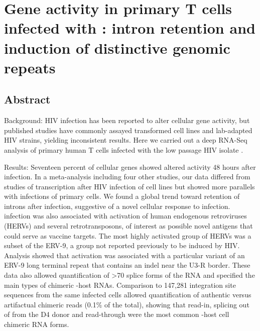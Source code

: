 \documentclass[../sherrill-Mix_thesis.tex]{subfiles}
\begin{document}
\graphicspath{{im/}{rnaSeq/im/}}


\newcommand{\nReads}{1,161,705,678}
\newcommand{\nHuman}{1,021,207,853}
\newcommand{\nHIV}{24,783,844}
\newcommand{\nHIVFrag}{12,689,879}
\newcommand{\nIntegrations}{147,281}


\chapter{Gene activity in primary T cells infected with \hivEight{}: intron retention and induction of distinctive genomic repeats}
\label{chapRnaSeq}


\section{Abstract}
	Background: HIV infection has been reported to alter cellular gene activity, but published studies have commonly assayed transformed cell lines and lab-adapted HIV strains, yielding inconsistent results. Here we carried out a deep RNA-Seq analysis of primary human T cells infected with the low passage HIV isolate \hivEight{}. 

	Results: Seventeen percent of cellular genes showed altered activity 48 hours after infection. In a meta-analysis including four other studies, our data differed from studies of transcription after HIV infection of cell lines but showed more parallels with infections of primary cells. We found a global trend toward retention of introns after infection, suggestive of a novel cellular response to infection. \hivEight{} infection was also associated with activation of human endogenous retroviruses (HERVs) and several retrotransposons, of interest as possible novel antigens that could serve as vaccine targets. The most highly activated group of HERVs was a subset of the ERV-9, a group not reported previously to be induced by HIV. Analysis showed that activation was associated with a particular variant of an ERV-9 long terminal repeat that contains an indel near the U3-R border. These data also allowed quantification of \textgreater{}70 splice forms of the \hivEight{} RNA and specified the main types of chimeric \hivEight{}-host RNAs. Comparison to \nIntegrations{} integration site sequences from the same infected cells allowed quantification of authentic versus artifactual chimeric reads (0.1\% of the total), showing that \fivePrime{} read-in, splicing out of \hivEight{} from the D4 donor and \threePrime{} read-through were the most common \hivEight{}-host cell chimeric RNA forms. 
\end{document}
